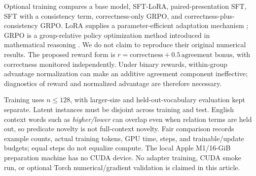 Optional training compares a base model, SFT-LoRA, paired-presentation SFT, SFT with a consistency term,
correctness-only GRPO, and correctness-plus-consistency GRPO. LoRA supplies a parameter-efficient adaptation
mechanism \citep{hu2021lora}; GRPO is a group-relative policy optimization method introduced in mathematical
reasoning \citep{shao2024deepseekmath}. We do not claim to reproduce their original numerical results. The
proposed reward form is $r = \text{correctness} + 0.5\,\text{agreement bonus}$, with correctness monitored
independently. Under binary rewards, within-group advantage normalization can make an additive agreement
component ineffective; diagnostics of reward and normalized advantage are therefore necessary.

Training uses $n \le 128$, with larger-size and held-out-vocabulary evaluation kept separate. Latent
instances must be disjoint across training and test. English context words such as \emph{higher/lower} can
overlap even when relation terms are held out, so predicate novelty is not full-context novelty. Fair
comparison records example counts, actual training tokens, GPU time, steps, and trainable/update budgets;
equal steps do not equalize compute. The local Apple M1/16-GiB preparation machine has no CUDA device. No
adapter training, CUDA smoke run, or optional Torch numerical/gradient validation is claimed in this
article.
